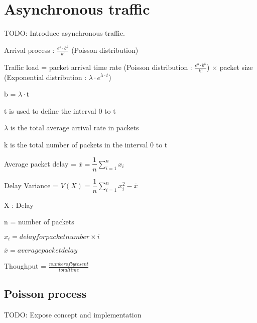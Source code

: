 \section{Asynchronous traffic}

TODO: Introduce asynchronous traffic.

\begin{description}
    \item Arrival process : $ \frac{e^{b} \cdot b^{k}}{k!}$ (Poisson distribution)
    \item Traffic load = packet arrival time rate  (Poisson distribution : $ \frac{e^{b} \cdot b^{k}}{k!}$) $\times$ packet size (Exponential distribution : $\lambda \cdot e^{ \lambda \cdot t}$)

	\begin{description}  
        \item b = $\lambda \cdot$t
        \item t is used to define the interval 0 to t   
        \item $\lambda$ is the total average arrival rate in packets
        \item k is the total number of packets in the interval 0 to t
   	\end{description}

    \item Average packet delay = $\overline{x} = \dfrac{1}{n} \sum_{i=1}^{n} x_{i}$
    \item Delay Variance = $ V(X) = \dfrac{1}{n} \sum_{i=1}^{n} x_{i}^{2} - \overline{x}$

    	\begin{description}
            \item X : Delay
            \item n = number of packets
            \item $x_{i} = delay for packet number \times i$
            \item $\overline{x} = average packet delay$
       	\end{description}

    \item Thoughput = $\frac{number of byte sent}{total time}$
\end{description}

\subsection{Poisson process}

TODO: Expose concept and implementation


